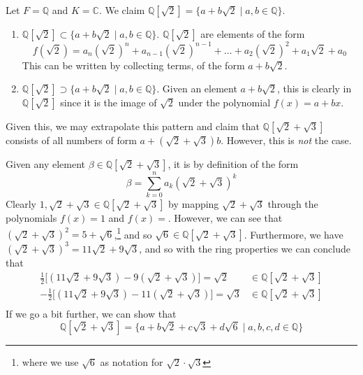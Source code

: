   \begin{example}
    Let $F = \mathbb{Q}$ and $K = \mathbb{C}$. We claim $\mathbb{Q}[\sqrt{2}] = \{a + b \sqrt{2} \mid a, b \in \mathbb{Q} \}$.
    \begin{enumerate}
      \item $\mathbb{Q}[\sqrt{2}] \subset \{a + b \sqrt{2} \mid a, b \in \mathbb{Q} \}$. $\mathbb{Q}[\sqrt{2}]$ are elements of the form
      \begin{equation}
        f(\sqrt{2}) = a_n (\sqrt{2})^n + a_{n-1} (\sqrt{2})^{n-1} + \ldots + a_2 (\sqrt{2})^2 + a_1 \sqrt{2} + a_0
      \end{equation} 
      This can be written by collecting terms, of the form $a + b \sqrt{2}$. 

      \item $\mathbb{Q}[\sqrt{2}] \supset \{a + b \sqrt{2} \mid a, b \in \mathbb{Q} \}$. Given an element $a + b \sqrt{2}$, this is clearly in $\mathbb{Q}[\sqrt{2}]$ since it is the image of $\sqrt{2}$ under the polynomial $f(x) = a + bx$. 
    \end{enumerate}
  \end{example} 

  Given this, we may extrapolate this pattern and claim that $\mathbb{Q}[\sqrt{2} + \sqrt{3}]$ consists of all numbers of form $a + (\sqrt{2} + \sqrt{3}) b$. However, this is \textit{not} the case. 

  \begin{example}
    Given any element $\beta \in \mathbb{Q}[\sqrt{2} + \sqrt{3}]$, it is by definition of the form 
    \begin{equation}
      \beta = \sum_{k=0}^n a_k (\sqrt{2} + \sqrt{3})^k 
    \end{equation} 
    Clearly $1, \sqrt{2} + \sqrt{3} \in \mathbb{Q}[\sqrt{2} + \sqrt{3}]$ by mapping $\sqrt{2} + \sqrt{3}$ through the polynomials $f(x) = 1$ and $f(x) = $. However, we can see that $(\sqrt{2} + \sqrt{3})^2 = 5 + \sqrt{6}$,\footnote{where we use $\sqrt{6}$ as notation for $\sqrt{2} \cdot \sqrt{3}$} and so $\sqrt{6} \in \mathbb{Q}[\sqrt{2} + \sqrt{3}]$. Furthermore, we have $(\sqrt{2} + \sqrt{3})^3 = 11 \sqrt{2} + 9 \sqrt{3}$, and so with the ring properties we can conclude that 
    \begin{align}
      \frac{1}{2} \big[ (11 \sqrt{2} + 9 \sqrt{3}) - 9 (\sqrt{2} + \sqrt{3})\big] = \sqrt{2} & \in \mathbb{Q}[\sqrt{2} + \sqrt{3}] \\
      -\frac{1}{2} \big[ (11 \sqrt{2} + 9 \sqrt{3}) - 11 (\sqrt{2} + \sqrt{3})\big] = \sqrt{3} & \in \mathbb{Q}[\sqrt{2} + \sqrt{3}] \\
    \end{align} 
    If we go a bit further, we can show that 
    \begin{equation}
      \mathbb{Q}[\sqrt{2} + \sqrt{3}] = \{a + b \sqrt{2} + c \sqrt{3} + d\sqrt{6} \mid a, b, c, d \in \mathbb{Q} \}
    \end{equation}
  \end{example}


